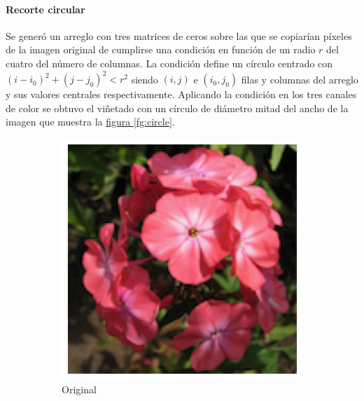 \documentclass{article}
\begin{document}
\paragraph{Recorte circular}
Se generó un arreglo con tres matrices de ceros sobre las que se copiarían píxeles de la imagen original de cumplirse una condición en función de un radio \(r\) del cuatro del número de columnas.
La condición define un círculo centrado con \((i- i_0)^2 + (j- j_0)^2 < r^2\) siendo \((i,j)\) e \((i_0, j_0)\) filas y columnas del arreglo y sus valores centrales respectivamente.
Aplicando la condición en los tres canales de color se obtuvo el viñetado con un círculo de diámetro mitad del ancho de la imagen que muestra la \hyperref[fg:circle]{figura \ref*{fg:circle}}. 


\begin{figure}
	\centering
	\begin{subfigure}[b]{0.24\textwidth}
		\includegraphics[width= \textwidth]{path0}
		\caption{Original}
		\label{fg:path0}
	\end{subfigure}
	\begin{subfigure}[b]{0.24\textwidth}

\end{subfigure}
\end{figure}
\end{document}
